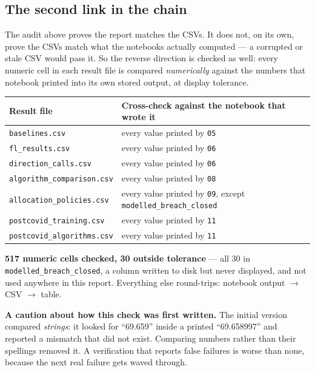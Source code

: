 \documentclass[11pt,a4paper]{article}
\newcommand{\keypoint}[1]{%
  \par\vspace{0.4em}%
  \noindent\colorbox{fed!8}{\parbox{0.98\textwidth}{\vspace{0.2em}#1\vspace{0.2em}}}%
  \par\vspace{0.4em}}
\begin{document}
\subsection*{The second link in the chain}

The audit above proves the report matches the CSVs. It does not, on its own, prove the CSVs match what
the notebooks actually computed --- a corrupted or stale CSV would pass it. So the reverse direction is
checked as well: every numeric cell in each result file is compared \emph{numerically} against the
numbers that notebook printed into its own stored output, at display tolerance.

\begin{center}
\footnotesize
\begin{tabular}{@{}ll@{}}
\toprule
\textbf{Result file} & \textbf{Cross-check against the notebook that wrote it} \\
\midrule
\texttt{baselines.csv} & every value printed by \texttt{05} \\
\texttt{fl\_results.csv} & every value printed by \texttt{06} \\
\texttt{direction\_calls.csv} & every value printed by \texttt{06} \\
\texttt{algorithm\_comparison.csv} & every value printed by \texttt{08} \\
\texttt{allocation\_policies.csv} & every value printed by \texttt{09}, except \texttt{modelled\_breach\_closed} \\
\texttt{postcovid\_training.csv} & every value printed by \texttt{11} \\
\texttt{postcovid\_algorithms.csv} & every value printed by \texttt{11} \\
\bottomrule
\end{tabular}
\end{center}

\textbf{517 numeric cells checked, 30 outside tolerance} --- all 30 in
\texttt{modelled\_breach\_closed}, a column written to disk but never displayed, and not used anywhere
in this report. Everything else round-trips: notebook output $\rightarrow$ CSV $\rightarrow$ table.

\keypoint{\textbf{A caution about how this check was first written.} The initial version compared
\emph{strings}: it looked for ``69.659'' inside a printed ``69.658997'' and reported a mismatch that did
not exist. Comparing numbers rather than their spellings removed it. A verification that reports false
failures is worse than none, because the next real failure gets waved through.}
\end{document}
